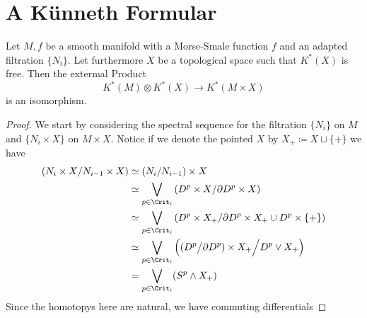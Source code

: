\section{A Künneth Formular}
\begin{lemma}Let $M,f$ be a smooth manifold with a Morse-Smale function $f$ and an adapted filtration $\{N_i\}$. Let furthermore $X$ be a topological space such that $K^*(X)$ is free. Then the extermal Product
	\begin{equation*}
		K^*(M)\otimes K^*(X)\to K^*(M\times X)
	\end{equation*} is an isomorphism.
\end{lemma}
\begin{proof}
	We start by considering the spectral sequence for the filtration $\{N_i\} $ on $M$ and $\{N_i\times X\}$ on $M\times X$. Notice if we denote the pointed $X$ by $X_+\coloneq X\sqcup \{+\}$ we have 
	\begin{align*}
		\left( N_i\times X\middle/N_{i-1}\times X \right)
		&\simeq \left( N_i / N_{i-1} \right) \times X\\
		&\simeq \bigvee_{p\in \Crit_i}\left( D^p\times X\middle/ \partial D^p \times X \right)\\
		&\simeq
		\bigvee_{p\in \Crit_i}\left( D^p\times X_+\middle/ \partial D^p \times X_+\cup D^p\times \{+\} \right)\\
		&\simeq 	\bigvee_{p\in \Crit_i}\left( (D^p\big/ \partial D^p) \times X_+ \Big/D^p\vee X_+\right)\\
		  &= \bigvee_{p\in \Crit_i}(S^p\wedge X_+)
	\end{align*} Since the homotopys here are natural, we have commuting differentials 
\end{proof}